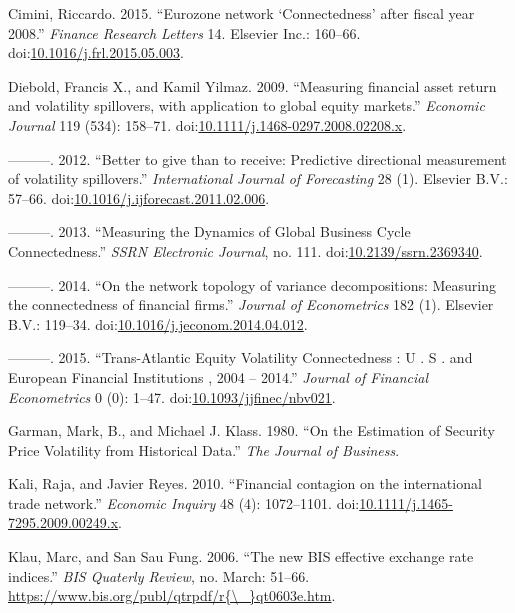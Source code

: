 \documentclass[]{elsarticle} %
\begin{document}
\hypertarget{ref-Cimini2015}{}
Cimini, Riccardo. 2015. ``Eurozone network `Connectedness' after fiscal
year 2008.'' \emph{Finance Research Letters} 14. Elsevier Inc.: 160--66.
doi:\href{https://doi.org/10.1016/j.frl.2015.05.003}{10.1016/j.frl.2015.05.003}.

\hypertarget{ref-Diebold2009}{}
Diebold, Francis X., and Kamil Yilmaz. 2009. ``Measuring financial asset
return and volatility spillovers, with application to global equity
markets.'' \emph{Economic Journal} 119 (534): 158--71.
doi:\href{https://doi.org/10.1111/j.1468-0297.2008.02208.x}{10.1111/j.1468-0297.2008.02208.x}.

\hypertarget{ref-Diebold2012}{}
---------. 2012. ``Better to give than to receive: Predictive
directional measurement of volatility spillovers.'' \emph{International
Journal of Forecasting} 28 (1). Elsevier B.V.: 57--66.
doi:\href{https://doi.org/10.1016/j.ijforecast.2011.02.006}{10.1016/j.ijforecast.2011.02.006}.

\hypertarget{ref-Diebold2013}{}
---------. 2013. ``Measuring the Dynamics of Global Business Cycle
Connectedness.'' \emph{SSRN Electronic Journal}, no. 111.
doi:\href{https://doi.org/10.2139/ssrn.2369340}{10.2139/ssrn.2369340}.

\hypertarget{ref-Diebold2014}{}
---------. 2014. ``On the network topology of variance decompositions:
Measuring the connectedness of financial firms.'' \emph{Journal of
Econometrics} 182 (1). Elsevier B.V.: 119--34.
doi:\href{https://doi.org/10.1016/j.jeconom.2014.04.012}{10.1016/j.jeconom.2014.04.012}.

\hypertarget{ref-Diebold2015}{}
---------. 2015. ``Trans-Atlantic Equity Volatility Connectedness : U .
S . and European Financial Institutions , 2004 -- 2014.'' \emph{Journal
of Financial Econometrics} 0 (0): 1--47.
doi:\href{https://doi.org/10.1093/jjfinec/nbv021}{10.1093/jjfinec/nbv021}.

\hypertarget{ref-Garman1980}{}
Garman, Mark, B., and Michael J. Klass. 1980. ``On the Estimation of
Security Price Volatility from Historical Data.'' \emph{The Journal of
Business}.

\hypertarget{ref-Kali2010}{}
Kali, Raja, and Javier Reyes. 2010. ``Financial contagion on the
international trade network.'' \emph{Economic Inquiry} 48 (4):
1072--1101.
doi:\href{https://doi.org/10.1111/j.1465-7295.2009.00249.x}{10.1111/j.1465-7295.2009.00249.x}.

\hypertarget{ref-Klau2006}{}
Klau, Marc, and San Sau Fung. 2006. ``The new BIS effective exchange
rate indices.'' \emph{BIS Quaterly Review}, no. March: 51--66.
\href{https://www.bis.org/publ/qtrpdf/r\%7B/_\%7Dqt0603e.htm}{https://www.bis.org/publ/qtrpdf/r\{\textbackslash{}\_\}qt0603e.htm}.
\end{document}
